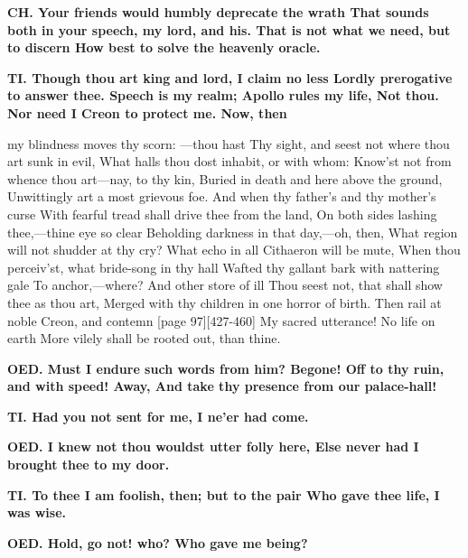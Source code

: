 \documentclass[11pt,letter]{book}
\begin{document}
\par \textbf{CH. Your friends would humbly deprecate the wrath That sounds both in your speech, my lord, and his. That is not what we need, but to discern How best to solve the heavenly oracle.}
\par 

\par \textbf{TI. Though thou art king and lord, I claim no less Lordly prerogative to answer thee. Speech is my realm; Apollo rules my life, Not thou. Nor need I Creon to protect me. Now, then}
\par   my blindness moves thy scorn: —thou hast Thy sight, and seest not where thou art sunk in evil, What halls thou dost inhabit, or with whom:  Know’st not from whence thou art—nay, to thy kin, Buried in death and here above the ground, Unwittingly art a most grievous foe. And when thy father’s and thy mother’s curse With fearful tread shall drive thee from the land, On both sides lashing thee,—thine eye so clear Beholding darkness in that day,—oh, then, What region will not shudder at thy cry? What echo in all Cithaeron will be mute, When thou perceiv’st, what bride-song in thy hall Wafted thy gallant bark with nattering gale To anchor,—where? And other store of ill Thou seest not, that shall show thee as thou art, Merged with thy children in one horror of birth. Then rail at noble Creon, and contemn [page 97][427-460] My sacred utterance! No life on earth More vilely shall be rooted out, than thine.

\par \textbf{OED. Must I endure such words from him? Begone! Off to thy ruin, and with speed! Away, And take thy presence from our palace-hall!}
\par 

\par \textbf{TI. Had you not sent for me, I ne’er had come.}
\par 

\par \textbf{OED. I knew not thou wouldst utter folly here, Else never had I brought thee to my door.}
\par 

\par \textbf{TI. To thee I am foolish, then; but to the pair Who gave thee life, I was wise.}
\par 

\par \textbf{OED. Hold, go not! who? Who gave me being?}
\par 
\end{document}
